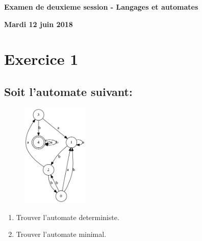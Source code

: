 \documentclass{article}%
\begin{document}
%
\normalsize%
\pagestyle{header}%
\begin{minipage}{\textwidth}%
\centering%
\begin{Large}%
\textbf{Examen de deuxieme session {-} Langages et automates}%
\end{Large}%
\linebreak%
\begin{large}%
\textbf{Mardi 12 juin 2018}%
\end{large}%
\end{minipage}%
\section{Exercice 1}%
\label{sec:Exercice1}%
\subsection{Soit l'automate suivant:}%
\label{subsec:Soitlautomatesuivant}%


\begin{figure}[h!]%
\centering%
\includegraphics[width=120px]{./../Results/abab.png}%
\end{figure}

%
\begin{enumerate}[label=\alph*),start=20]%
\item%
Trouver l'automate deterministe.%
\item%
Trouver l'automate minimal.%
\end{enumerate}

%
\end{document}
